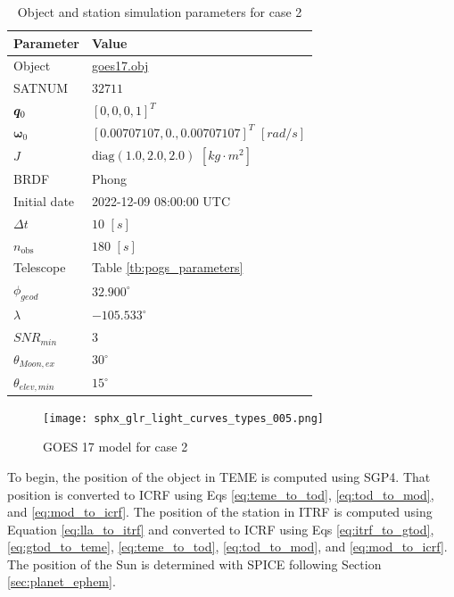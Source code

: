 \begin{table}[]
  \centering
  \begin{tabular}{|l|l|}
  \hline
  \textbf{Parameter} & \textbf{Value} \\ \hline
  Object & \href{https://raw.githubusercontent.com/liamrobinson1/Light-Curve-Models/main/accurate_sats/matlib_goes17.obj}{goes17.obj} \\ \hline
  SATNUM & $32711$ \\ \hline
  $\bm{q}_0$ & $\left[ 0, 0, 0, 1 \right]^T$ \\ \hline
  $\boldsymbol{\omega}_0$ & $\left[ 0.00707107, 0.,         0.00707107 \right]^T$ $[rad/s]$ \\ \hline
  $J$ & $\mathrm{diag}\left( 1.0, 2.0, 2.0 \right)$ $\left[ kg \cdot m^2 \right]$ \\ \hline
  BRDF & Phong \\ \hline
  Initial date & 2022-12-09 08:00:00 UTC \\ \hline
  $\Delta t$ & $10$ $[s]$ \\ \hline
  $n_\mathrm{obs}$ & $180$ $[s]$ \\ \hline
  Telescope & Table \ref{tb:pogs_parameters} \\ \hline
  $\phi_{geod}$ & $32.900^\circ$ \\ \hline
  $\lambda$ & $-105.533^\circ$ \\ \hline
  $SNR_{min}$ & $3$ \\ \hline
  $\theta_{Moon,ex}$ & $30^\circ$ \\ \hline
  $\theta_{elev,min}$ & $15^\circ$ \\ \hline
  \end{tabular}
  \caption{Object and station simulation parameters for case 2}
  \label{tb:case2_obj_props}
\end{table}

\begin{figure}[!htb]
  \centering
  \texttt{[image: sphx\_glr\_light\_curves\_types\_005.png]}
  \caption{GOES 17 model for case 2}
  \label{fig:case2_obj}
\end{figure}

To begin, the position of the object in TEME is computed using SGP4. That position is converted to ICRF using Eqs \ref{eq:teme_to_tod}, \ref{eq:tod_to_mod}, and \ref{eq:mod_to_icrf}. The position of the station in ITRF is computed using Equation \ref{eq:lla_to_itrf} and converted to ICRF using Eqs \ref{eq:itrf_to_gtod}, \ref{eq:gtod_to_teme}, \ref{eq:teme_to_tod}, \ref{eq:tod_to_mod}, and \ref{eq:mod_to_icrf}. The position of the Sun is determined with SPICE following Section \ref{sec:planet_ephem}. 

